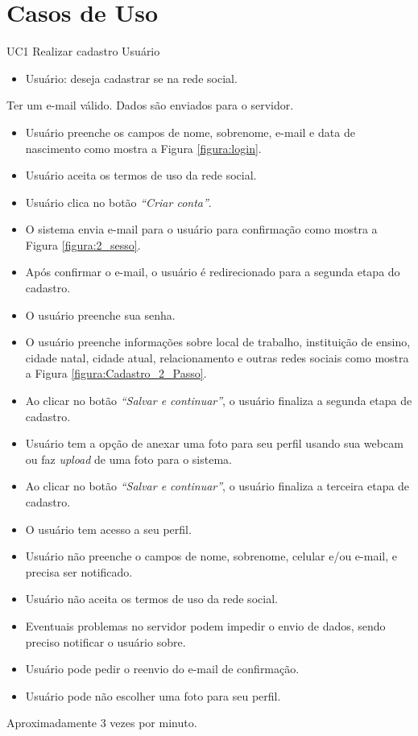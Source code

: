 \chapter{Casos de Uso}

\casoDeUso
{UC1}
{Realizar cadastro}
{Usuário}
{
\begin{itemize}
	\item Usuário: deseja cadastrar se na rede social.	
\end{itemize}

}
{Ter um e-mail válido.}
{Dados são enviados para o servidor.}
{
\begin{itemize}
	\item Usuário preenche os campos de nome, sobrenome, e-mail e data de nascimento como mostra a Figura  \ref{figura:login}. %
	\item Usuário aceita os termos de uso da rede social.		
	\item Usuário clica no botão \textit{“Criar conta”}.	
	\item O sistema envia e-mail para o usuário para confirmação como mostra a Figura \ref{figura:2_sesso}.
	\item Após confirmar o e-mail, o usuário é redirecionado para a segunda etapa do cadastro.		
	\item O usuário preenche sua senha.
	\item O usuário preenche informações sobre local de trabalho, instituição de ensino, cidade natal, cidade atual, relacionamento e outras redes sociais como mostra a Figura \ref{figura:Cadastro_2_Passo}.
	\item Ao clicar no botão \textit{“Salvar e continuar”}, o usuário finaliza a segunda etapa de cadastro.	
	\item Usuário tem a opção de anexar uma foto para seu perfil usando sua webcam ou faz \textit{upload} de uma foto para o sistema.%
	\item Ao clicar no botão \textit{“Salvar e continuar”}, o usuário finaliza a terceira etapa de cadastro.
	\item O usuário tem acesso a seu perfil.	
	
			
\end{itemize}
}
{
\begin{itemize}
	\item Usuário não preenche o campos de nome, sobrenome, celular e/ou e-mail, e precisa ser notificado.
	\item Usuário não aceita os termos de uso da rede social.
	\item Eventuais problemas no servidor podem impedir o envio de dados, sendo preciso notificar o usuário sobre.
	\item Usuário pode pedir o reenvio do e-mail de confirmação.
	\item Usuário pode não escolher uma foto para seu perfil.
	
\end{itemize}
}
{Aproximadamente 3 vezes por minuto.}
{

}

